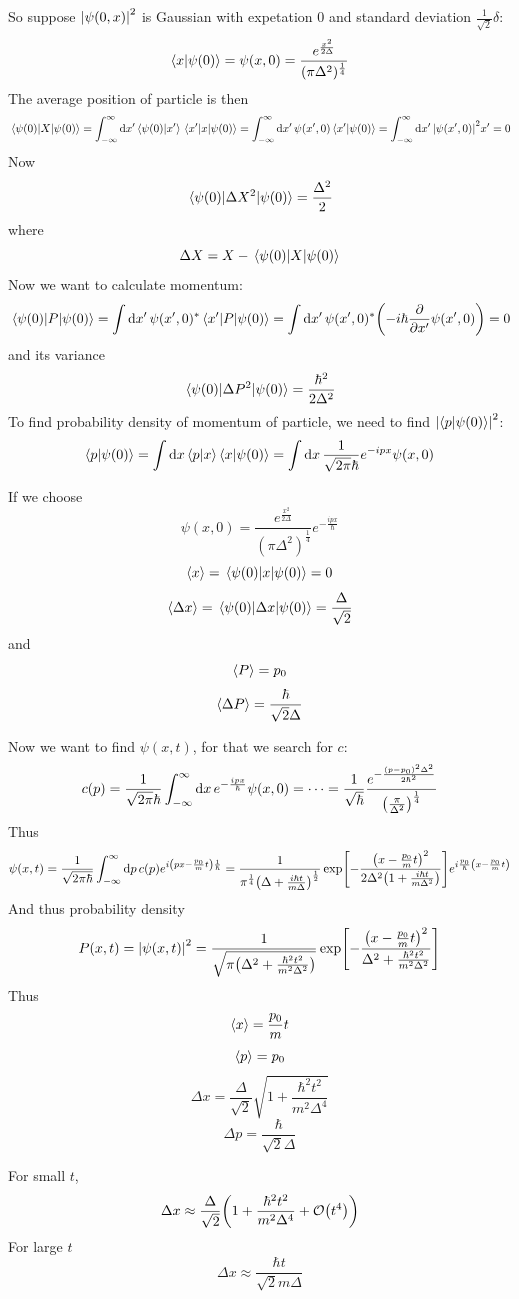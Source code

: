 So suppose $\abs{\psi(0,x)}^2$ is Gaussian with expetation 0 and standard deviation $\frac{1}{\sqrt{2}}\delta$:
$$\braket{x}{\psi(0)} =\psi(x,0) = \frac{e^{\frac{x^2}{2\Delta}}}{(\pi \Delta^2)^{\frac{1}{4}}}$$
The average position of particle is then
$$\mel{\psi(0)}{X}{\psi(0)}  = \int_{-\infty}^{\infty}  \dd{x'} \braket{\psi(0)}{x'} \mel{x'}{x}{\psi(0)} = \int_{-\infty}^{\infty}  \dd{x'} \psi(x',0) \braket{x'}{\psi(0)} = \int_{-\infty}^{\infty}  \dd{x'} \abs{\psi(x',0)}^2 x' = 0 $$
Now
$$\mel{\psi(0)}{\Delta X^2}{\psi(0)} = \frac{\Delta^2}{2}$$
where
$$\Delta X = X -\mel{\psi(0)}{X}{\psi(0)}$$
Now we want to calculate momentum:
$$\mel{\psi(0)}{P}{\psi(0)} = \int \dd{x'} \psi(x', 0)^*  \mel{x'}{P}{\psi(0)} = \int \dd{x'} \psi(x', 0)^* \qty( -i\hbar \pdv{x'} \psi(x',0)) = 0  $$
and its variance
$$\mel{\psi(0)}{\Delta P^2}{\psi(0)} = \frac{\hbar^2}{2\Delta^2}$$
To find probability density of momentum of particle, we need to find $\abs{\braket{p}{\psi(0)}}^2$:
$$\braket{p}{\psi(0)} = \int \dd{x} \braket{p}{x} \braket{x}{\psi(0)} = \int \dd{x} \frac{1}{\sqrt{2\pi}\hbar} e^{-ipx} \psi(x,0) $$

If we choose
$$\psi(x,0) = \frac{e^{\frac{x^2}{2\Delta}}}{(\pi \Delta^2)^{\frac{1}{4}}} e^{-\frac{ipx}{\hbar}}$$
$$\expval{x} = \mel{\psi(0)}{x}{\psi(0)} = 0$$
$$\expval{\Delta x} = \mel{\psi(0)}{\Delta x}{\psi(0)} = \frac{\Delta}{\sqrt{2}}$$
and
$$\expval{P} = p_0$$
$$\expval{\Delta P} = \frac{\hbar}{\sqrt{2}\Delta}$$

Now we want to find $\psi(x,t)$, for that we search for $c$:
$$c(p) = \frac{1}{\sqrt{2\pi} \hbar} \int_{-\infty}^\infty \dd{x} e^{-\frac{ipx}{\hbar}} \psi(x,0) = \dots = \frac{1}{\sqrt{\hbar}} \frac{e^{-\frac{(p-p_0)^2\Delta^2}{2\hbar^2}}}{\qty(\frac{\pi}{\Delta^2})^{\frac{1}{4}}} $$
Thus
$$\psi(x,t) = \frac{1}{\sqrt{2\pi \hbar}} \int_{-\infty}^\infty \dd{p} c(p) e^{i\qty(px-\frac{p_0}{m}t)\frac{1}{\hbar}} =\frac{1}{\pi^{\frac{1}{4}}\qty(\Delta + \frac{i\hbar t}{m\Delta})^{\frac{1}{2}}} \exp[{-\frac{\qty(x-\frac{p_0}{m}t)^{2}}{2\Delta^2\qty(1 + \frac{i\hbar t}{m\Delta^2})}}] e^{i\frac{p_0}{\hbar} \qty(x-\frac{p_0}{m}t)} $$
And thus probability density
$$P(x,t) = \abs{\psi(x,t) }^2 = \frac{1}{\sqrt{\pi \qty(\Delta^2 + \frac{\hbar^2 t^2}{m^2\Delta^2})}} \exp[{-\frac{\qty(x-\frac{p_0}{m}t)^2}{\Delta^2 + \frac{\hbar^2 t^2}{m^2\Delta^2}}}] $$
Thus
$$\expval{x} = \frac{p_0}{m}t$$
$$\expval{p} = p_0$$
$$\Delta x = \frac{\Delta}{\sqrt{2}} \sqrt{1 + \frac{\hbar^2 t^2}{m^2\Delta^4}}$$
$$\Delta p = \frac{\hbar}{\sqrt{2}\Delta}$$

For small $t$,
$$\Delta x \approx \frac{\Delta}{\sqrt{2}} \qty( 1 + \frac{\hbar^2 t^2}{m^2\Delta^4} + \order{t^4})$$
For large $t$
$$\Delta x \approx  \frac{\hbar t}{\sqrt{2} m\Delta}$$

